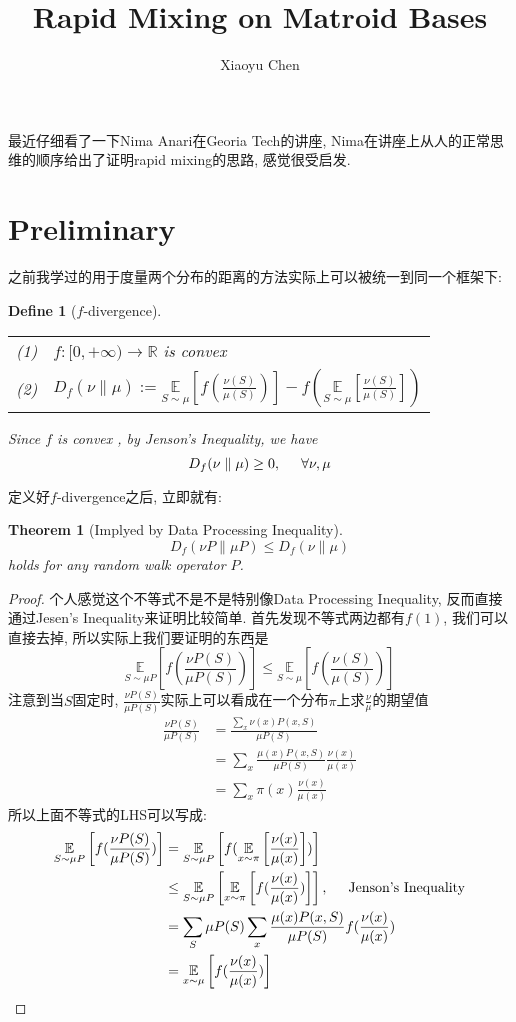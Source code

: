 \documentclass{article}
\title{Rapid Mixing on Matroid Bases}
\author{Xiaoyu Chen}
\date{}
\newtheorem{theorem}{Theorem}
\newtheorem{define}{Define}
\def\~{\sim}
\def\R{\mathbb{R}}
\def\E_#1#2{\underset{#1}{\mathbb{E}}\left[#2\right]}
\begin{document}
\maketitle
最近仔细看了一下Nima Anari在Georia Tech的讲座, 
Nima在讲座上从人的正常思维的顺序给出了证明rapid mixing的思路,
感觉很受启发.

\section{Preliminary}
之前我学过的用于度量两个分布的距离的方法实际上可以被统一到同一个框架下:
\begin{define}[$f$-divergence]
 \ %
  
 \begin{tabular}{l l}
   (1) & $f: [0, +\infty) \to \R$ is convex \\
   (2) & $\displaystyle D_f(\nu\parallel\mu) := \E_{S\~\mu}{f(\frac{\nu(S)}{\mu(S)})} - f\left(\E_{S\~\mu}{\frac{\nu(S)}{\mu(S)}}\right)$
 \end{tabular}

  Since $f$ is convex , by Jenson's Inequality, we have
  \[D_f(\nu\parallel\mu) \geq 0, \hspace{0.5cm} \forall \nu, \mu\]
\end{define}

{\flushleft 定义好$f$-divergence之后, 立即就有: }
\begin{theorem}[Implyed by Data Processing Inequality]
  \[D_f(\nu P \parallel \mu P) \leq D_f(\nu \parallel \mu)\]
  holds for any random walk operator $P$.
\end{theorem}
\begin{proof}[Proof]
  个人感觉这个不等式不是不是特别像Data Processing Inequality, 反而直接通过Jesen's Inequality来证明比较简单.
  首先发现不等式两边都有$f(1)$, 我们可以直接去掉, 所以实际上我们要证明的东西是
  \[\E_{S\~\mu P}{f(\frac{\nu P(S)}{\mu P(S)})} \leq \E_{S\~\mu}{f(\frac{\nu(S)}{\mu(S)})}\]
  注意到当$S$固定时, $\frac{\nu P(S)}{\mu P(S)}$实际上可以看成在一个分布$\pi$上求$\frac{\nu}{\mu}$的期望值
  \begin{align*}
    \frac{\nu P(S)}{\mu P(S)}
    &= \frac{\sum_{x} \nu(x) P(x, S)}{\mu P(S)} \\
    &= \sum_x\frac{\mu(x) P(x, S) }{\mu P(S)} \frac{\nu(x)}{\mu(x)}\\
    &= \sum_{x} \pi(x) \frac{\nu(x)}{\mu(x)}
  \end{align*}
  所以上面不等式的LHS可以写成:
  \begin{align*}
    \E_{S\~\mu P}{f(\frac{\nu P(S)}{\mu P(S)})}
    &= \E_{S\~\mu P}{f(\E_{x\~\pi}{\frac{\nu(x)}{\mu(x)}})} \\
    &\leq \E_{S\~\mu P}{\E_{x\~\pi}{f(\frac{\nu(x)}{\mu(x)})}}, \hspace{0.5cm} \mbox{Jenson's Inequality} \\
    &= \sum_{S} \mu P(S) \sum_{x} \frac{\mu(x)P(x,S)}{\mu P(S)} f(\frac{\nu(x)}{\mu(x)}) \\
    &= \E_{x\~\mu}{f(\frac{\nu(x)}{\mu(x)})} \qedhere
  \end{align*}
\end{proof}
\end{document}
